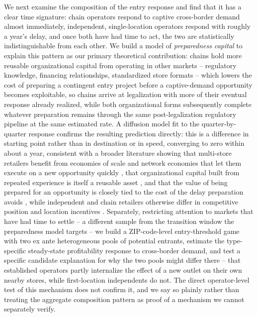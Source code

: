 \documentclass[english,12pt]{article}
\begin{document}
We next examine the composition of the entry response and find that it has a clear time signature: chain operators respond to captive cross-border demand almost immediately, independent, single-location operators respond with roughly a year's delay, and once both have had time to act, the two are statistically indistinguishable from each other. We build a model of \emph{preparedness capital} to explain this pattern as our primary theoretical contribution: chains hold more reusable organizational capital from operating in other markets -- regulatory knowledge, financing relationships, standardized store formats -- which lowers the cost of preparing a contingent entry project before a captive-demand opportunity becomes exploitable, so chains arrive at legalization with more of their eventual response already realized, while both organizational forms subsequently complete whatever preparation remains through the same post-legalization regulatory pipeline at the same estimated rate. A diffusion model fit to the quarter-by-quarter response confirms the resulting prediction directly: this is a difference in starting point rather than in destination or in speed, converging to zero within about a year, consistent with a broader literature showing that multi-store retailers benefit from economies of scale and network economies that let them execute on a new opportunity quickly \citep{EllicksonHoughtonTimmins2013,HollenbeckGiroldo2022,Holmes2011,Jia2008}, that organizational capital built from repeated experience is itself a reusable asset \citep{PrescottVisscher1980}, and that the value of being prepared for an opportunity is closely tied to the cost of the delay preparation avoids \citep{Dixit1989,FudenbergTirole1985}, while independent and chain retailers otherwise differ in competitive position and location incentives \citep{AdamsEtAl2018,TalamasMarcos2025}. Separately, restricting attention to markets that have had time to settle -- a different sample from the transition window the preparedness model targets -- we build a ZIP-code-level entry-threshold game with two ex ante heterogeneous pools of potential entrants, estimate the type-specific steady-state profitability response to cross-border demand, and test a specific candidate explanation for why the two pools might differ there -- that established operators partly internalize the effect of a new outlet on their own nearby stores, while first-location independents do not. The direct operator-level test of this mechanism does not confirm it, and we say so plainly rather than treating the aggregate composition pattern as proof of a mechanism we cannot separately verify.
\end{document}
